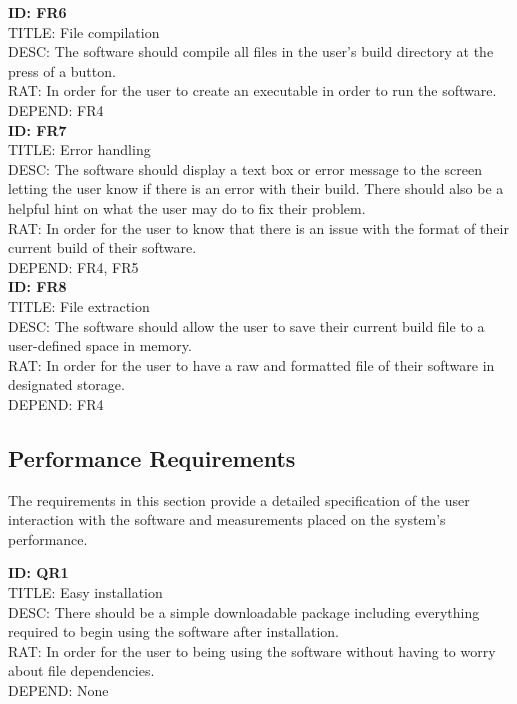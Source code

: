 \documentclass[a4paper,10pt]{article} \usepackage[margin=1.0in]{geometry} \usepackage{pdfpages} \usepackage{graphicx}
\begin{document}
\noindent
\textbf{ID: FR6}\\
TITLE: File compilation\\
DESC: The software should compile all files in the user's build directory at the press of a button.\\
RAT: In order for the user to create an executable in order to run the software.\\
DEPEND: FR4\\

\noindent
\textbf{ID: FR7}\\
TITLE: Error handling\\
DESC: The software should display a text box or error message to the screen letting the user know if there is an error with their build. 
There should also be a helpful hint on what the user may do to fix their problem.\\
RAT: In order for the user to know that there is an issue with the format of their current build of their software.\\
DEPEND: FR4, FR5\\

\noindent
\textbf{ID: FR8}\\
TITLE: File extraction\\
DESC: The software should allow the user to save their current build file to a user-defined space in memory.\\
RAT: In order for the user to have a raw and formatted file of their software in designated storage.\\
DEPEND: FR4\\


\subsection{Performance Requirements}

The requirements in this section provide a detailed specification of the user interaction with the software and measurements placed on the system's performance.

\noindent
\textbf{ID: QR1}\\
TITLE: Easy installation\\
DESC: There should be a simple downloadable package including everything required to begin using the software after installation.\\
RAT: In order for the user to being using the software without having to worry about file dependencies.\\
DEPEND: None\\
\end{document}
